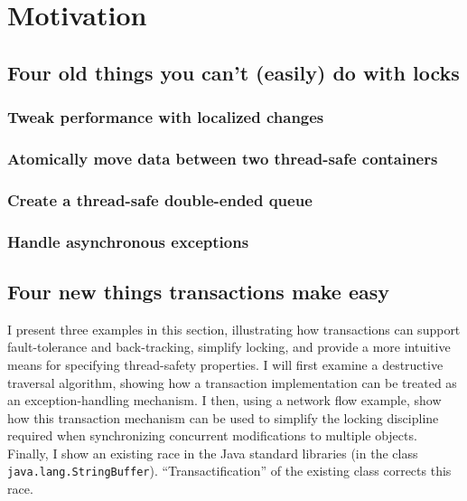 \section{Motivation}
\subsection{Four old things you can't (easily) do with locks}

\subsubsection{Tweak performance with localized changes}
\subsubsection{Atomically move data between two thread-safe containers}
\subsubsection{Create a thread-safe double-ended queue}
\subsubsection{Handle asynchronous exceptions}

\subsection{Four new things transactions make easy}

I present three examples in this section, illustrating how
transactions can support fault-tolerance and back-tracking,
simplify locking, and provide a more intuitive
means for specifying thread-safety properties.
I will first examine a destructive traversal algorithm, showing how a
transaction implementation can be treated as an exception-handling
mechanism.   I then, using a network flow example, show how this
transaction mechanism can be used to simplify
the locking discipline required when synchronizing concurrent
modifications to multiple objects.
Finally, I show an existing race in the Java standard libraries (in 
the class \texttt{java.lang.StringBuffer}).  ``Transactification'' of
the existing class corrects this race.

